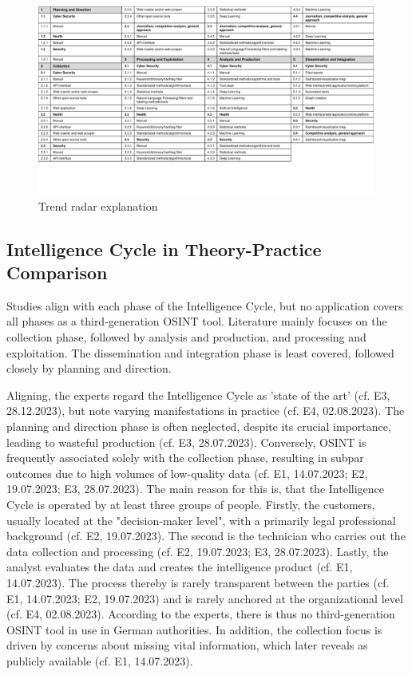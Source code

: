 \documentclass[10pt]{article}
\begin{document}
\begin{figure}[thb]
    \centering
    \includegraphics[width=0.99\textwidth]{PDF/images/crop_Trendradar explanation}
    \caption{Trend radar explanation}
    \label{fig:trendradarexplanation}
\end{figure}

\subsection{Intelligence Cycle in Theory-Practice Comparison}

Studies align with each phase of the Intelligence Cycle, but no application covers all phases as a third-generation OSINT tool. Literature mainly focuses on the collection phase, followed by analysis and production, and processing and exploitation. The dissemination and integration phase is least covered, followed closely by planning and direction.

Aligning, the experts regard the Intelligence Cycle as 'state of the art' (cf. E3, 28.12.2023), but note varying manifestations in practice (cf. E4, 02.08.2023).
The planning and direction phase is often neglected, despite its crucial importance, leading to wasteful production (cf. E3, 28.07.2023). Conversely, OSINT is frequently associated solely with the collection phase,
resulting in subpar outcomes due to high volumes of low-quality data (cf. E1, 14.07.2023; E2, 19.07.2023; E3, 28.07.2023). The main reason for this is, that the Intelligence Cycle is operated by at least three groups of people. Firstly, the customers, usually located at the "decision-maker level", with a primarily legal professional background (cf. E2, 19.07.2023).
The second is the technician who carries out the data collection and processing (cf. E2, 19.07.2023; E3, 28.07.2023). Lastly, the analyst evaluates the data and creates the intelligence product (cf. E1, 14.07.2023). The process thereby is rarely transparent between the parties
(cf. E1, 14.07.2023; E2, 19.07.2023) and is rarely anchored at the organizational level (cf. E4, 02.08.2023). According to the experts, there is thus no third-generation
OSINT tool in use in German authorities. In addition, the collection focus is driven by concerns about missing vital information, which later reveals as publicly available (cf. E1, 14.07.2023).
\end{document}
